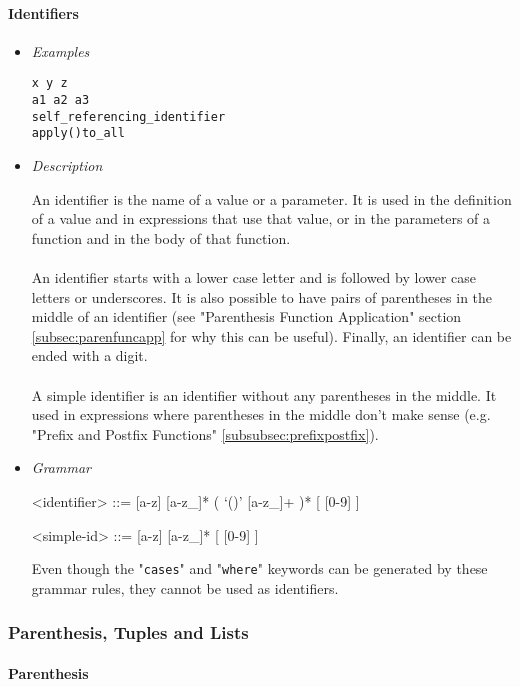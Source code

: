 \documentclass{article}
\begin{document}
\paragraph{Identifiers}
\begin{itemize}

\item \textit{Examples}
\begin{verbatim}
x y z
a1 a2 a3 
self_referencing_identifier 
apply()to_all
\end{verbatim}

\item \textit{Description}

An identifier is the name of a value or a parameter. It is used in the
definition of a value and in expressions that use that value, or in the
parameters of a function and in the body of that function.
\\\\
An identifier starts with a lower case letter and is followed by lower case
letters or underscores. It is also possible to have pairs of parentheses in the
middle of an identifier (see "Parenthesis Function Application" section
\ref{subsec:parenfuncapp} for why this can be useful).  Finally, an identifier
can be ended with a digit.
\\\\
A simple identifier is an identifier without any parentheses in the middle.
It used in expressions where parentheses in the middle don't make sense 
(e.g. "Prefix and Postfix Functions" \ref{subsubsec:prefixpostfix}).

\item \textit{Grammar}
\begin{grammar}
<identifier> ::= [a-z] [a-z_]* ( `()' [a-z_]+ )* [ [0-9] ]

<simple-id> ::= [a-z] [a-z_]* [ [0-9] ]
\end{grammar}
Even though the "\verb|cases|" and "\verb|where|" keywords can be generated
by these grammar rules, they cannot be used as identifiers.

\end{itemize}

\newpage
\subsubsection{Parenthesis, Tuples and Lists}

\paragraph{Parenthesis}
\end{document}
